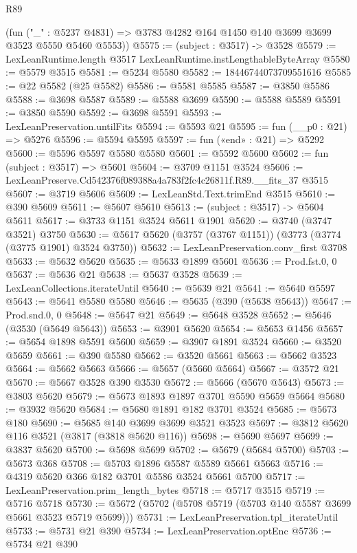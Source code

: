\begin{lexlean}{R89}
\begin{coremodule}
      (fun ("_" : @5237 @4831) => @3783 @4282 @164 @1450 @140 @3699 @3699 @3523 @5550 @5460 @5553))
@5575 := (subject : @3517) -> @3528
@5579 := LexLeanRuntime.length @3517 LexLeanRuntime.instLengthableByteArray
@5580 := @5579 @3515
@5581 := @5234 @5580
@5582 := 18446744073709551616
@5585 := @22 @5582 (@25 @5582)
@5586 := @5581 @5585
@5587 := @3850 @5586
@5588 := @3698 @5587
@5589 := @5588 @3699
@5590 := @5588 @5589
@5591 := @3850 @5590
@5592 := @3698 @5591
@5593 := LexLeanPreservation.untilFits
@5594 := @5593 @21
@5595 := fun (__p0 : @21) => @5276
@5596 := @5594 @5595
@5597 := fun («end» : @21) => @5292
@5600 := @5596 @5597 @5580 @5580
@5601 := @5592 @5600
@5602 := fun (subject : @3517) => @5601
@5604 := @3709 @1151 @3524
@5606 := LexLeanPreserve.Cd542376f089388a4a783f2fc4c26811f.R89.__fits_37 @3515
@5607 := @3719 @5606
@5609 := LexLeanStd.Text.trimEnd @3515
@5610 := @390 @5609
@5611 := @5607 @5610
@5613 := (subject : @3517) -> @5604 @5611
@5617 := @3733 @1151 @3524 @5611 @1901
@5620 := @3740 (@3747 @3521) @3750
@5630 := @5617 @5620 (@3757 (@3767 @1151)) (@3773 (@3774 (@3775 @1901) @3524 @3750))
@5632 := LexLeanPreservation.conv_first @3708
@5633 := @5632 @5620
@5635 := @5633 @1899 @5601
@5636 := Prod.fst.{0, 0}
@5637 := @5636 @21
@5638 := @5637 @3528
@5639 := LexLeanCollections.iterateUntil
@5640 := @5639 @21
@5641 := @5640 @5597
@5643 := @5641 @5580 @5580
@5646 := @5635 (@390 (@5638 @5643))
@5647 := Prod.snd.{0, 0}
@5648 := @5647 @21
@5649 := @5648 @3528
@5652 := @5646 (@3530 (@5649 @5643))
@5653 := @3901 @5620
@5654 := @5653 @1456
@5657 := @5654 @1898 @5591 @5600
@5659 := @3907 @1891 @3524
@5660 := @3520 @5659
@5661 := @390 @5580
@5662 := @3520 @5661
@5663 := @5662 @3523
@5664 := @5662 @5663
@5666 := @5657 (@5660 @5664)
@5667 := @3572 @21
@5670 := @5667 @3528 @390 @3530
@5672 := @5666 (@5670 @5643)
@5673 := @3803 @5620
@5679 := @5673 @1893 @1897 @3701 @5590 @5659 @5664
@5680 := @3932 @5620
@5684 := @5680 @1891 @182 @3701 @3524
@5685 := @5673 @180
@5690 := @5685 @140 @3699 @3699 @3521 @3523
@5697 := @3812 @5620 @116 @3521 (@3817 (@3818 @5620 @116))
@5698 := @5690 @5697
@5699 := @3837 @5620
@5700 := @5698 @5699
@5702 := @5679 (@5684 @5700)
@5703 := @5673 @368
@5708 := @5703 @1896 @5587 @5589 @5661 @5663
@5716 := @4319 @5620 @366 @182 @3701 @5586 @3524 @5661 @5700
@5717 := LexLeanPreservation.prim_length_bytes
@5718 := @5717 @3515
@5719 := @5716 @5718
@5730 := @5672 (@5702 (@5708 @5719 (@5703 @140 @5587 @3699 @5661 @3523 @5719 @5699)))
@5731 := LexLeanPreservation.tpl_iterateUntil
@5733 := @5731 @21 @390
@5734 := LexLeanPreservation.optEnc
@5736 := @5734 @21 @390

\end{coremodule}
\end{lexlean}
